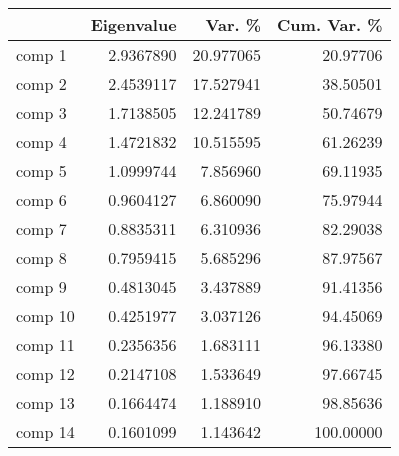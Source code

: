 
\begin{tabular}[t]{lrrr}
\toprule
  & Eigenvalue & Var. \% & Cum. Var. \%\\
\midrule
comp 1 & 2.9367890 & 20.977065 & 20.97706\\
comp 2 & 2.4539117 & 17.527941 & 38.50501\\
comp 3 & 1.7138505 & 12.241789 & 50.74679\\
comp 4 & 1.4721832 & 10.515595 & 61.26239\\
comp 5 & 1.0999744 & 7.856960 & 69.11935\\
\addlinespace
comp 6 & 0.9604127 & 6.860090 & 75.97944\\
comp 7 & 0.8835311 & 6.310936 & 82.29038\\
comp 8 & 0.7959415 & 5.685296 & 87.97567\\
comp 9 & 0.4813045 & 3.437889 & 91.41356\\
comp 10 & 0.4251977 & 3.037126 & 94.45069\\
\addlinespace
comp 11 & 0.2356356 & 1.683111 & 96.13380\\
comp 12 & 0.2147108 & 1.533649 & 97.66745\\
comp 13 & 0.1664474 & 1.188910 & 98.85636\\
comp 14 & 0.1601099 & 1.143642 & 100.00000\\
\bottomrule
\end{tabular}
